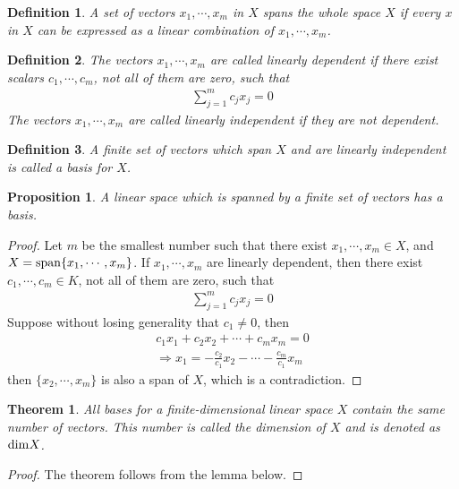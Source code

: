 \documentclass[11pt]{book}
\newtheorem{definition}{Definition}[section]
\newtheorem{theorem}{Theorem}[section]
\newtheorem{proposition}{Proposition}[section]
\theoremstyle{definition}
\numberwithin{equation}{subsection}
\begin{document}
\begin{definition}
A set of vectors $x_1,\cdots, x_m$ in $X$ spans the whole space $X$ if every $x$ in $X$ can be expressed as a linear combination of $x_1,\cdots, x_m$.
\end{definition}

\begin{definition}
The vectors $x_1,\cdots, x_m$ are called linearly dependent if there exist scalars $c_1,\cdots, c_m$, not all of them are zero, such that
\begin{align*}
    \sum^m_{j=1} c_j x_j = 0
\end{align*}
The vectors $x_1,\cdots, x_m$ are called linearly independent if they are not dependent. 
\end{definition}

\begin{definition}
A finite set of vectors which span $X$ and are linearly independent is called a basis for $X$.
\end{definition}

\medskip

\begin{proposition}
A linear space which is spanned by a finite set of vectors has a basis.
\end{proposition}
\begin{proof}
Let $m$ be the smallest number such that there exist $x_1,\cdots,x_m \in X$, and $X = {\rm span}\{x_1,\cdots,x_m\}$. If $x_1,\cdots,x_m$ are linearly dependent, then there exist $c_1,\cdots,c_m\in K$, not all of them are zero, such that
\begin{align*}
    \sum^m_{j=1}c_j x_j = 0
\end{align*}
Suppose without losing generality that $c_1 \neq 0$, then 
\begin{align*}
    c_1 x_1 + c_2 x_2 + \cdots + c_m x_m = 0\\
    \Rightarrow x_1 = -\frac{c_2}{c_1}x_2 - \cdots - \frac{c_m}{c_1}x_m
\end{align*}
then $\{x_2,\cdots,x_m\}$ is also a span of $X$, which is a contradiction.
\end{proof}

\medskip

\begin{theorem}
All bases for a finite-dimensional linear space $X$ contain the
same number of vectors. This number is called the dimension of $X$ and is denoted as ${\rm dim} X$.
\end{theorem}
\begin{proof}
The theorem follows from the lemma below.
\end{proof}
\end{document}

